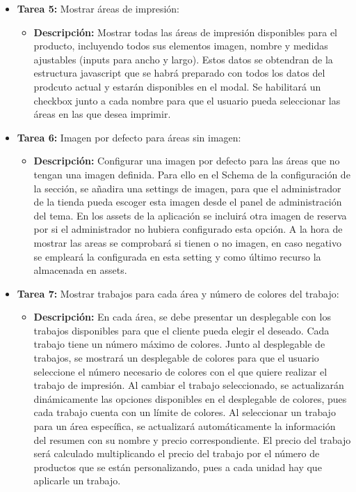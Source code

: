 \documentclass[12pt]{article}
\begin{document}
\begin{itemize}
\begin{itemize}[label=--]
          \end{itemize}
    \item \textbf{Tarea 5:} Mostrar áreas de impresión:
          \begin{itemize}[label=--]
              \item \textbf{Descripción:} Mostrar todas las áreas de impresión disponibles para el producto, incluyendo todos sus elementos imagen, nombre y medidas ajustables (inputs para ancho y largo). Estos datos se obtendran de la estructura javascript que se habrá preparado con todos los datos del prodcuto actual y estarán disponibles en el modal. Se habilitará un checkbox junto a cada nombre para que el usuario pueda seleccionar las áreas en las que desea imprimir.
          \end{itemize}
    \item \textbf{Tarea 6:} Imagen por defecto para áreas sin imagen:
          \begin{itemize}[label=--]
              \item \textbf{Descripción:} Configurar una imagen por defecto para las áreas que no tengan una imagen definida. Para ello en el Schema de la configuración de la sección, se añadira una settings de imagen, para que el administrador de la tienda pueda escoger esta imagen desde el panel de administración del tema. En los assets de la aplicación se incluirá otra imagen de reserva por si el administrador no hubiera configurado esta opción. A la hora de mostrar las areas se comprobará si tienen o no imagen, en caso negativo se empleará la configurada en esta setting y como último recurso la almacenada en assets.
          \end{itemize}
    \item \textbf{Tarea 7:} Mostrar trabajos para cada área y número de colores del trabajo:
          \begin{itemize}[label=--]
              \item \textbf{Descripción:} En cada área, se debe presentar un desplegable con los trabajos disponibles para que el cliente pueda elegir el deseado. Cada trabajo tiene un número máximo de colores. Junto al desplegable de trabajos, se mostrará un desplegable de colores para que el usuario seleccione el número necesario de colores con el que quiere realizar el trabajo de impresión. Al cambiar el trabajo seleccionado, se actualizarán dinámicamente las opciones disponibles en el desplegable de colores, pues cada trabajo cuenta con un límite de colores. Al seleccionar un trabajo para un área específica, se actualizará automáticamente la información del resumen con su nombre y precio correspondiente. El precio del trabajo será calculado multiplicando el precio del trabajo por el número de productos que se están personalizando, pues a cada unidad hay que aplicarle un trabajo.

\end{itemize}
\end{itemize}
\end{document}
